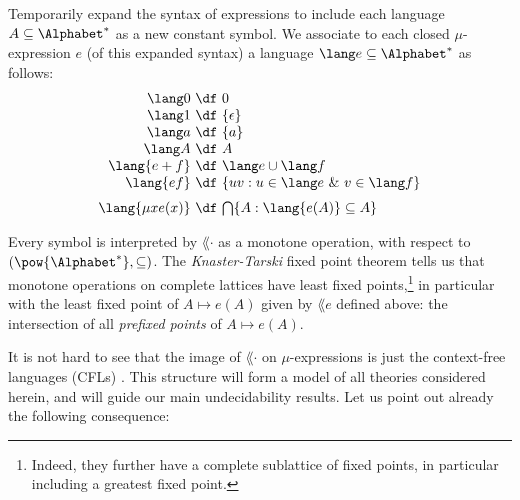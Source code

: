 \documentclass[runningheads]{amsart}
\begin{document}
\begin{example}
    [Languages]
    \label{language-model}
    Temporarily expand the syntax of expressions to include each language $A\subseteq \Alphabet^*$ as a new constant symbol.
    We associate to each closed $\mu$-expression $e$ (of this expanded syntax) a language $\lang e \subseteq \Alphabet^*$ as follows:
    \[
    \begin{array}{r@{\ \df \ }l}
         \lang 0 & 0 \\
         \lang 1 & \{\epsilon\} \\
         \lang a & \{a\} \\
         \lang A & A\\
         \lang {e+f} & \lang e \cup \lang f \\
          \lang {ef} & \{ uv : u \in \lang e \ \& \ v \in \lang f\} \\
         \noalign{\medskip}
          \lang {\mu x e(x)} & \bigcap\{ A : \lang {e(A)} \subseteq A \}
    \end{array}
    \]
\end{example}
Every symbol is interpreted by $\lang\cdot$ as a monotone operation, with respect to $(\pow {\Alphabet^*}, \subseteq)$.
The \emph{Knaster-Tarski} fixed point theorem tells us that monotone operations on complete lattices have least fixed points,\footnote{Indeed, they further have a complete sublattice of fixed points, in particular including a greatest fixed point.} in particular with the least fixed point of $A \mapsto e(A)$ given by $\lang e $ defined above: the intersection of all \emph{prefixed points} of $A \mapsto e(A)$.

It is not hard to see that the image of $\lang \cdot$ on $\mu$-expressions is just the context-free languages (CFLs) \cite{Gruska71:cfls-by-mu-exprs}.
This structure will form a model of all theories considered herein, and will guide our main undecidability results.
Let us point out already the following consequence:
\end{document}

